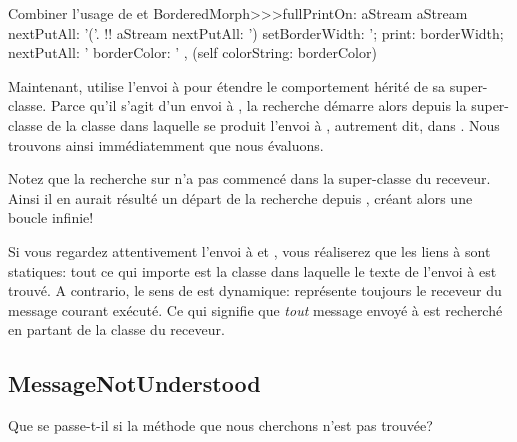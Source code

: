 \documentclass[a4paper,10pt,twoside]{book}
\begin{document}

\begin{method}[fullPrintOn]{Combiner l'usage de \super et \self}
BorderedMorph>>>fullPrintOn: aStream
	aStream nextPutAll: '('.
	!!
	aStream nextPutAll: ') setBorderWidth: '; print: borderWidth;
		nextPutAll: ' borderColor: ' , (self colorString: borderColor)
\end{method}
Maintenant,  utilise l'envoi à \super pour étendre le comportement  hérité de sa super-classe.
Parce qu'il s'agit d'un envoi à \super, la recherche démarre alors
depuis la super-classe de la classe dans laquelle se produit l'envoi à
\super, autrement dit, dans 
.
Nous trouvons ainsi immédiatemment  que nous évaluons.

Notez que la recherche sur \super n'a pas commencé dans la 
super-classe du receveur. Ainsi il en aurait résulté
un départ de la recherche depuis , 
créant alors une boucle infinie!


Si vous regardez attentivement l'envoi à \super et , vous réaliserez que les liens à \super sont statiques: tout ce qui importe
est la classe dans laquelle le texte de l'envoi à \super est trouvé.
A contrario, le sens de \self est dynamique: \self représente toujours le
receveur du message courant exécuté. Ce qui signifie que  \emph{tout} message envoyé à \self est recherché en partant de la classe du receveur.

\subsection{MessageNotUnderstood}

Que se passe-t-il si la méthode que nous cherchons n'est pas trouvée?
\end{document}
